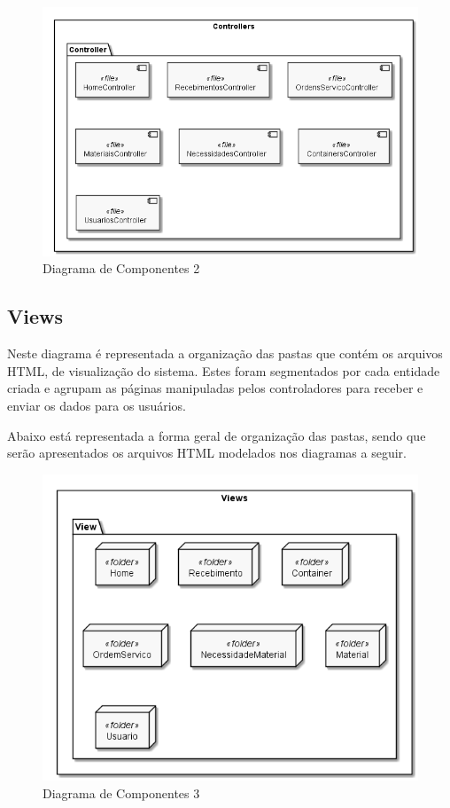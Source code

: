 \documentclass[rascunho,xindy,acronym,symbols]{fei}
\begin{document}
\begin{figure}[H]
    \centering
    \includegraphics[scale=0.6, width=400pt]{./Images/Diagrama_de_Componentes_-_Controllers.png}
    \caption{Diagrama de Componentes 2}
    \label{fig:diag_componentes2}
\end{figure}

\subsection{Views}

Neste diagrama é representada a organização das pastas que contém os arquivos HTML, de visualização do sistema. Estes foram segmentados por cada entidade criada e agrupam as páginas manipuladas pelos controladores para receber e enviar os dados para os usuários.

Abaixo está representada a forma geral de organização das pastas, sendo que serão apresentados os arquivos HTML modelados nos diagramas a seguir.

\begin{figure}[H]
    \centering
    \includegraphics[scale=0.6, width=400pt]{./Images/Diagrama_de_Componentes_-_Views.png}
    \caption{Diagrama de Componentes 3}
    \label{fig:diag_componentes3}
\end{figure}
\end{document}
